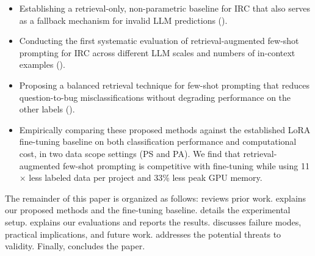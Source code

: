 \begin{itemize}
  \item Establishing a retrieval-only, non-parametric baseline for IRC that also serves as a fallback mechanism for invalid LLM predictions (\votag).

  \item Conducting the first systematic evaluation of retrieval-augmented
  few-shot prompting for IRC across different LLM scales and numbers of
  in-context examples (\ragtag).

  \item Proposing a balanced retrieval technique for few-shot prompting that
  reduces question-to-bug misclassifications without degrading performance on
  the other labels (\bragtag).

  \item Empirically comparing these proposed methods against the
  established LoRA fine-tuning baseline on both classification performance and
  computational cost, in two data scope settings (PS and PA). We find that
  retrieval-augmented few-shot prompting is competitive with fine-tuning while
  using 11$\times$ less labeled data per project and 33\% less peak GPU memory.
\end{itemize}

The remainder of this paper is organized as follows:  reviews prior work.  explains our proposed methods and the fine-tuning baseline.  details the experimental setup.  explains our
evaluations and reports the results.  discusses failure modes, practical implications, and future work.  addresses the potential threats to validity. Finally,  concludes the paper.



